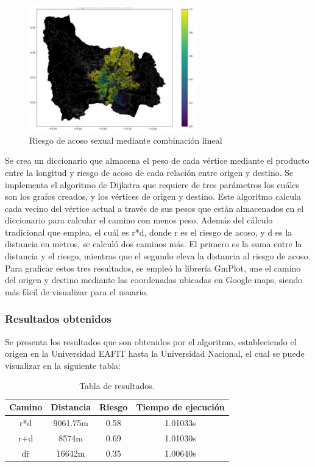 \begin{figure}[h]
	\begin{center}
		\includegraphics[width=0.65\textwidth]{2/figures/segmento.jpg}
		\caption{Riesgo de acoso sexual mediante combinación lineal}
		\label{1:fig2}
	\end{center}
\end{figure}

Se crea un diccionario que almacena el peso de cada vértice mediante el producto entre la longitud y riesgo de acoso de cada relación entre origen y destino. Se implementa el algoritmo de Dijkstra que requiere de tres parámetros los cuáles son los grafos creados, y los vértices de origen y destino. Este algoritmo calcula cada vecino del vértice actual a través de sus pesos que están almacenados en el diccionario para calcular el camino con menos peso. Además del cálculo tradicional que emplea, el cuál es r*d, donde r es el riesgo de acoso, y d es la distancia en metros, se calculó dos caminos más. El primero es la suma entre la distancia y el riesgo, mientras que el segundo eleva la distancia al riesgo de acoso. Para graficar estos tres resultados, se empleó la librería GmPlot, une el camino del origen y destino mediante las coordenadas ubicadas en Google maps, siendo más fácil de visualizar para el usuario.


\subsubsection{Resultados obtenidos}
Se presenta los resultados que son obtenidos por el algoritmo, estableciendo el origen en la Universidad EAFIT hasta la Universidad Nacional, el cual se puede visualizar en la siguiente tabla:%

\begin{table}[h]
	\centering
	\begin{tabular}{c|c|c|c}
		Camino & Distancia & Riesgo & Tiempo de ejecución\\\hline
		r*d & 9061.75m & 0.58& 1.01033s\\
		r+d & 8574m& 0.69& 1.01030s\\
		d\^r& 16642m& 0.35& 1.00640s
	\end{tabular}
	\caption{\label{tab:results}Tabla de resultados.}
\end{table}

